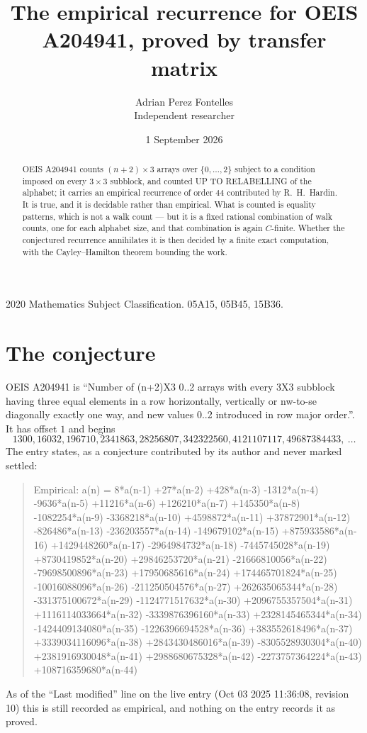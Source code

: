 \documentclass[11pt,a4paper]{article}
\title{The empirical recurrence for OEIS A204941, proved by transfer matrix}
\author{Adrian Perez Fontelles\\ \small Independent researcher}
\date{1 September 2026}
\theoremstyle{plain}
\theoremstyle{definition}
\begin{document}
\maketitle

\begin{abstract}
OEIS A204941 counts $(n+2)\times3$ arrays over $\{0,\dots,2\}$ subject to a condition imposed on
every $3\times3$ subblock, and counted UP TO RELABELLING of the
alphabet; it carries an empirical recurrence of order $44$ contributed by
R.~H.~Hardin. It is true, and it is decidable rather than empirical. What is counted is
equality patterns, which is not a walk count --- but it is a fixed rational combination of
walk counts, one for each alphabet size, and that combination is again $C$-finite. Whether the
conjectured recurrence annihilates it is then decided by a finite exact computation, with the
Cayley--Hamilton theorem bounding the work.
\end{abstract}

\noindent\small 2020 Mathematics Subject Classification. 05A15, 05B45, 15B36.\normalsize

\section{The conjecture}

OEIS A204941 is ``Number of (n+2)X3 0..2 arrays with every 3X3 subblock having three equal elements in a row horizontally, vertically or nw-to-se diagonally exactly one way, and new values 0..2 introduced in row major order.''. It has offset $1$ and begins
\[
1300, 16032, 196710, 2341863, 28256807, 342322560, 4121107117, 49687384433,\ \dots
\]
The entry states, as a conjecture contributed by its author and never marked settled:
\begin{quote}
Empirical: a(n) = 8*a(n-1) +27*a(n-2) +428*a(n-3) -1312*a(n-4) -9636*a(n-5) +11216*a(n-6) +126210*a(n-7) +145350*a(n-8) -1082254*a(n-9) -3368218*a(n-10) +4598872*a(n-11) +37872901*a(n-12) -826486*a(n-13) -236203557*a(n-14) -149679102*a(n-15) +875933586*a(n-16) +1429448260*a(n-17) -2964984732*a(n-18) -7445745028*a(n-19) +8730419852*a(n-20) +29846253720*a(n-21) -21666810056*a(n-22) -79698500896*a(n-23) +17950685616*a(n-24) +174465701824*a(n-25) -10016088096*a(n-26) -211250504576*a(n-27) +262635065344*a(n-28) -331375100672*a(n-29) -1124771517632*a(n-30) +2096755357504*a(n-31) +1116114033664*a(n-32) -3339876396160*a(n-33) +2328145465344*a(n-34) -1424409134080*a(n-35) -1226396694528*a(n-36) +383552618496*a(n-37) +3339034116096*a(n-38) +2843430486016*a(n-39) -8305528930304*a(n-40) +2381916930048*a(n-41) +2988680675328*a(n-42) -2273757364224*a(n-43) +108716359680*a(n-44)
\end{quote}
As of the ``Last modified'' line on the live entry (Oct 03 2025 11:36:08, revision 10) this is still
recorded as empirical, and nothing on the entry records it as proved.
\end{document}
